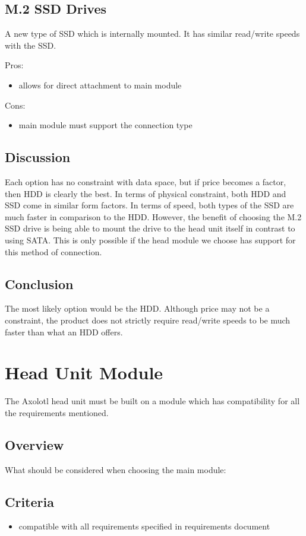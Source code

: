 \documentclass[onecolumn, draftclsnofoot,10pt, compsoc]{IEEEtran}
\begin{document}
\subsection{M.2 SSD Drives}
A new type of SSD which is internally mounted. It has similar read/write speeds with the SSD. 

Pros:
\begin{itemize}
    \item allows for direct attachment to main module
\end{itemize}

Cons:
\begin{itemize}
    \item main module must support the connection type
\end{itemize}

\subsection{Discussion}
Each option has no constraint with data space, but if price becomes a factor, then HDD is clearly the best.
In terms of physical constraint, both HDD and SSD come in similar form factors.
In terms of speed, both types of the SSD are much faster in comparison to the HDD. 
However, the benefit of choosing the M.2 SSD drive is being able to mount the drive to the head unit itself in contrast to using SATA. This is only possible if the head module we choose has support for this method of connection.
\subsection{Conclusion}
The most likely option would be the HDD. Although price may not be a constraint, the product does not strictly require read/write speeds to be much faster than what an HDD offers. 

\section{Head Unit Module}
The Axolotl head unit must be built on a module which has compatibility for all the requirements mentioned.

\subsection{Overview}
What should be considered when choosing the main module:
\subsection{Criteria}
\begin{itemize}
    \item compatible with all requirements specified in requirements document
\end{itemize}
\end{document}
